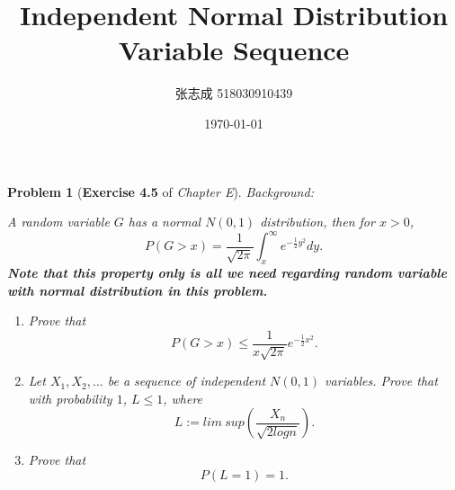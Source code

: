 \documentclass[UTF8, 12pt]{article}
\title{Independent Normal Distribution Variable Sequence}
\author{张志成 518030910439}
\date{\today}
\theoremstyle{break}
\newtheorem{problem}{Problem}
\begin{document}
    \maketitle
    
    \begin{problem}[\textbf{Exercise 4.5} of \textit{Chapter E}]
        \textit{Background: } \par
        A random variable $G$ has a normal $N(0,1)$ distribution, then for $x > 0$,
        $$
        P(G > x) = \frac{1}{\sqrt{2\pi}}\int_{x}^{\infty}e^{-\frac{1}{2}y^2}dy.
        $$
        \textbf{Note that this property only is all we need regarding random variable with normal distribution in this problem.}
        \begin{enumerate}
            \item Prove that  $$ P(G > x) \leq \frac{1}{x\sqrt{2\pi}}e^{-\frac{1}{2}x^2}. $$
            \item
                Let $X_1,X_2,...$ be a sequence of independent $N(0,1)$ variables. Prove that with probability $1$, $L \leq 1$, where
                $$
                L := lim\ sup(\frac{X_n}{\sqrt{2logn}}).
                $$
            \item Prove that $$ P(L = 1) = 1.$$
        \end{enumerate}
    \end{problem}
\end{document}
